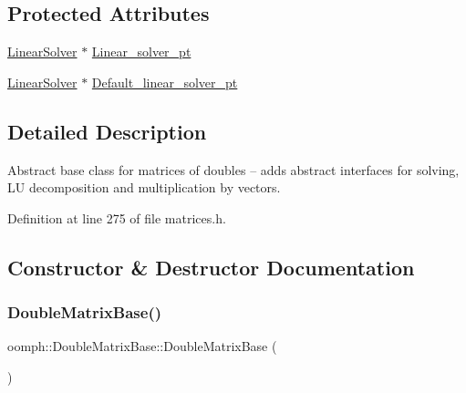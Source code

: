 \subsection*{Protected Attributes}
\begin{DoxyCompactItemize}
\item 
\hyperlink{classoomph_1_1LinearSolver}{Linear\+Solver} $\ast$ \hyperlink{classoomph_1_1DoubleMatrixBase_a86f0315e581cd5b41b75867383aa3760}{Linear\+\_\+solver\+\_\+pt}
\item 
\hyperlink{classoomph_1_1LinearSolver}{Linear\+Solver} $\ast$ \hyperlink{classoomph_1_1DoubleMatrixBase_a6ef2e36e4e5907af2738934f131e8dcf}{Default\+\_\+linear\+\_\+solver\+\_\+pt}
\end{DoxyCompactItemize}


\subsection{Detailed Description}
Abstract base class for matrices of doubles -- adds abstract interfaces for solving, LU decomposition and multiplication by vectors. 

Definition at line 275 of file matrices.\+h.



\subsection{Constructor \& Destructor Documentation}
\mbox{\label{classoomph_1_1DoubleMatrixBase_a9ab2dcaf990403cd43d4b952f7dbaa1c}} 
\subsubsection{\texorpdfstring{Double\+Matrix\+Base()}{DoubleMatrixBase()}\hspace{0.1cm}{\footnotesize\ttfamily [1/2]}}
{\footnotesize\ttfamily oomph\+::\+Double\+Matrix\+Base\+::\+Double\+Matrix\+Base (\begin{DoxyParamCaption}{ }\end{DoxyParamCaption})\hspace{0.3cm}{\ttfamily [inline]}}



